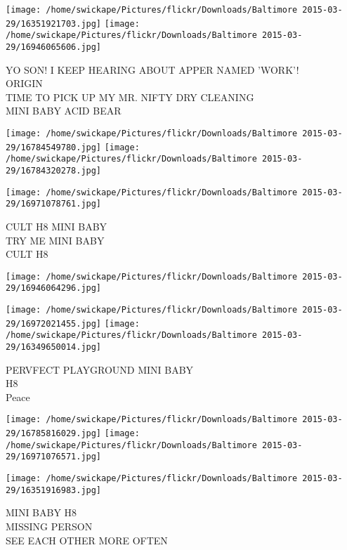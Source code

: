 \documentclass[10pt,letterpaper]{article}
\begin{document}
\texttt{[image: /home/swickape/Pictures/flickr/Downloads/Baltimore 2015-03-29/16351921703.jpg]}
\texttt{[image: /home/swickape/Pictures/flickr/Downloads/Baltimore 2015-03-29/16946065606.jpg]}

YO SON!  I KEEP HEARING ABOUT APPER NAMED 'WORK'!\\
ORIGIN\\
TIME TO PICK UP MY MR. NIFTY DRY CLEANING\\
MINI BABY ACID BEAR\\
\pagebreak

\texttt{[image: /home/swickape/Pictures/flickr/Downloads/Baltimore 2015-03-29/16784549780.jpg]}
\texttt{[image: /home/swickape/Pictures/flickr/Downloads/Baltimore 2015-03-29/16784320278.jpg]}

\texttt{[image: /home/swickape/Pictures/flickr/Downloads/Baltimore 2015-03-29/16971078761.jpg]}

CULT H8 MINI BABY\\
TRY ME MINI BABY\\
CULT H8\\
\pagebreak

\texttt{[image: /home/swickape/Pictures/flickr/Downloads/Baltimore 2015-03-29/16946064296.jpg]}

\vspace{0.25in}
\texttt{[image: /home/swickape/Pictures/flickr/Downloads/Baltimore 2015-03-29/16972021455.jpg]}
\texttt{[image: /home/swickape/Pictures/flickr/Downloads/Baltimore 2015-03-29/16349650014.jpg]}

PERVFECT PLAYGROUND MINI BABY\\
H8\\
Peace\\
\pagebreak

\texttt{[image: /home/swickape/Pictures/flickr/Downloads/Baltimore 2015-03-29/16785816029.jpg]}
\texttt{[image: /home/swickape/Pictures/flickr/Downloads/Baltimore 2015-03-29/16971076571.jpg]}

\vspace{0.25in}
\texttt{[image: /home/swickape/Pictures/flickr/Downloads/Baltimore 2015-03-29/16351916983.jpg]}

MINI BABY H8\\
MISSING PERSON\\
SEE EACH OTHER MORE OFTEN\\
\pagebreak
\end{document}
